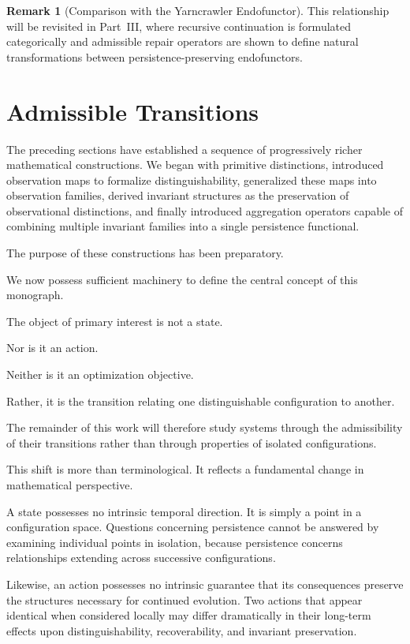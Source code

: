 \documentclass[11pt]{book}
\numberwithin{equation}{chapter}
\theoremstyle{definition}
\newtheorem{remark}[definition]{Remark}
\theoremstyle{plain}
\begin{document}
\begin{remark}[Comparison with the Yarncrawler Endofunctor]
This relationship will be revisited in Part~III, where recursive continuation is formulated categorically and admissible repair operators are shown to define natural transformations between persistence-preserving endofunctors.
\end{remark}

\section{Admissible Transitions}

The preceding sections have established a sequence of progressively richer mathematical constructions. We began with primitive distinctions, introduced observation maps to formalize distinguishability, generalized these maps into observation families, derived invariant structures as the preservation of observational distinctions, and finally introduced aggregation operators capable of combining multiple invariant families into a single persistence functional.

The purpose of these constructions has been preparatory.

We now possess sufficient machinery to define the central concept of this monograph.

The object of primary interest is not a state.

Nor is it an action.

Neither is it an optimization objective.

Rather, it is the transition relating one distinguishable configuration to another.

The remainder of this work will therefore study systems through the admissibility of their transitions rather than through properties of isolated configurations.

This shift is more than terminological. It reflects a fundamental change in mathematical perspective.

A state possesses no intrinsic temporal direction. It is simply a point in a configuration space. Questions concerning persistence cannot be answered by examining individual points in isolation, because persistence concerns relationships extending across successive configurations.

Likewise, an action possesses no intrinsic guarantee that its consequences preserve the structures necessary for continued evolution. Two actions that appear identical when considered locally may differ dramatically in their long-term effects upon distinguishability, recoverability, and invariant preservation.
\end{document}
